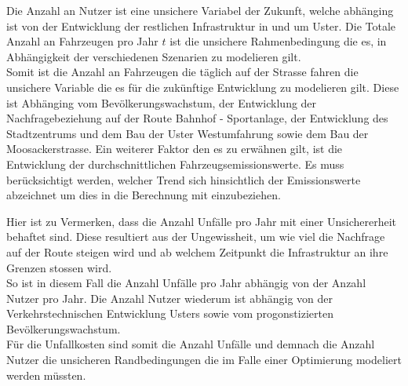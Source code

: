 Die Anzahl an Nutzer ist eine unsichere Variabel der Zukunft, welche abhänging ist von der Entwicklung der restlichen Infrastruktur in und um Uster. Die Totale Anzahl an Fahrzeugen pro Jahr $t$ ist die unsichere Rahmenbedingung die es, in Abhängigkeit der verschiedenen Szenarien zu modelieren gilt. \\
Somit ist die Anzahl an Fahrzeugen die täglich auf der Strasse fahren die unsichere Variable die es für die zukünftige Entwicklung zu modelieren gilt. 
Diese ist Abhänging vom Bevölkerungswachstum, der Entwicklung der Nachfragebeziehung auf der Route Bahnhof - Sportanlage, der Entwicklung des Stadtzentrums und dem Bau der Uster Westumfahrung sowie dem Bau der Moosackerstrasse. Ein weiterer Faktor den es zu erwähnen gilt, ist die Entwicklung der durchschnittlichen Fahrzeugsemissionswerte. Es muss berücksichtigt werden, welcher Trend sich hinsichtlich der Emissionswerte abzeichnet um dies in die Berechnung mit einzubeziehen.

Hier ist zu Vermerken, dass die Anzahl Unfälle pro Jahr mit einer Unsichererheit behaftet sind. Diese resultiert aus der Ungewissheit, um wie viel die Nachfrage auf der Route steigen wird und ab welchem Zeitpunkt die Infrastruktur an ihre Grenzen stossen wird.\\ [2ex]
So ist in diesem Fall die Anzahl Unfälle pro Jahr abhängig von der Anzahl Nutzer pro Jahr. Die Anzahl Nutzer wiederum ist abhängig von der Verkehrstechnischen Entwicklung Usters sowie vom progonstizierten Bevölkerungswachstum. \\
Für die Unfallkosten sind somit die Anzahl Unfälle und demnach die Anzahl Nutzer die unsicheren Randbedingungen die im Falle einer Optimierung modeliert werden müssten.

%

